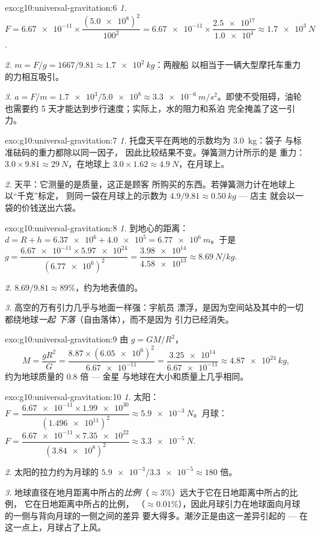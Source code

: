\begin{solution}{exo:g10:universal-gravitation:6}
\emph{1.} $F = \num{6.67e-11} \times
\dfrac{(\num{5.0e8})^2}{100^2}
= \num{6.67e-11} \times \dfrac{\num{2.5e17}}{\num{1.0e4}}
\approx \qty{1.7e3}{N}$.

\emph{2.} $m = F/g = 1667/9.81 \approx \qty{1.7e2}{kg}$：两艘船
以相当于一辆大型摩托车重力的力相互吸引。

\emph{3.} $a = F/m = \num{1.7e3}/\num{5.0e8} \approx
\qty{3.3e-6}{m/s^2}$。即使不受阻碍，油轮也需要约
5 天才能达到步行速度；实际上，水的阻力和系泊
完全掩盖了这一引力。
\end{solution}

\begin{solution}{exo:g10:universal-gravitation:7}
\emph{1.} 托盘天平在两地的示数均为 \qty{3.0}{kg}：袋子
与标准砝码的重力都除以同一因子，
因此比较结果不变。弹簧测力计所示的是
重力：$3.0 \times 9.81 \approx \qty{29}{N}$，在地球上
$3.0 \times 1.62 \approx \qty{4.9}{N}$，在月球上。

\emph{2.} 天平：它测量的是质量，这正是顾客
所购买的东西。若弹簧测力计在地球上以“千克”标定，
则同一袋在月球上的示数为 $4.9/9.81 \approx \qty{0.50}{kg}$ --- 店主
就会以一袋的价钱送出六袋。
\end{solution}

\begin{solution}{exo:g10:universal-gravitation:8}
\emph{1.} 到地心的距离：
$d = R + h = \num{6.37e6} + \num{4.0e5} = \qty{6.77e6}{m}$。于是
$g = \dfrac{\num{6.67e-11} \times \num{5.97e24}}{(\num{6.77e6})^2}
= \dfrac{\num{3.98e14}}{\num{4.58e13}} \approx \qty{8.69}{N/kg}$.

\emph{2.} $8.69/9.81 \approx 89\%$，约为地表值的。

\emph{3.} 高空的万有引力几乎与地面一样强：宇航员
漂浮，是因为空间站及其中的一切都绕地球\emph{一起
下落}（自由落体），而不是因为
引力已经消失。
\end{solution}

\begin{solution}{exo:g10:universal-gravitation:9}
由 $g = GM/R^2$，
\[
M = \frac{g R^2}{G}
= \frac{8.87 \times (\num{6.05e6})^2}{\num{6.67e-11}}
= \frac{\num{3.25e14}}{\num{6.67e-11}}
\approx \qty{4.87e24}{kg},
\]
约为地球质量的 $0.8$ 倍 --- 金星
与地球在大小和质量上几乎相同。
\end{solution}

\begin{solution}{exo:g10:universal-gravitation:10}
\emph{1.} 太阳：
$F = \dfrac{\num{6.67e-11} \times \num{1.99e30}}{(\num{1.496e11})^2}
\approx \qty{5.9e-3}{N}$。月球：
$F = \dfrac{\num{6.67e-11} \times \num{7.35e22}}{(\num{3.84e8})^2}
\approx \qty{3.3e-5}{N}$.

\emph{2.} 太阳的拉力约为月球的
$\num{5.9e-3}/\num{3.3e-5} \approx 180$ 倍。

\emph{3.} 地球直径在地月距离中所占的\emph{比例}（$\approx 3\%$）远大于它在日地距离中所占的比例，
它在日地距离中所占的比例，
（$\approx 0.01\%$），因此月球引力在地球面向月球的一侧与背向月球的一侧之间的差异
要大得多。潮汐正是由这一差异引起的 ---
在这一点上，月球占了上风。
\end{solution}

